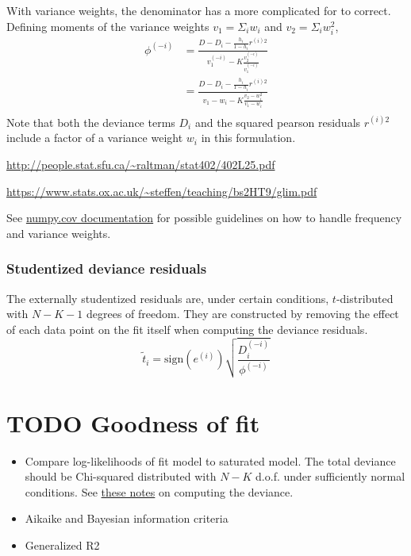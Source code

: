 \documentclass{article}
\begin{document}
With variance weights, the denominator has a more complicated for to correct.
Defining moments of the variance weights $v_1 = \Sigma_i w_i$ and $v_2 = \Sigma_i w_i^2$,
\begin{align}
  \phi^{(-i)} &= \frac{D - D_i - \frac{h_i}{1-h_i} r^{(i)2} }{v_1^{(-i)} - K \frac{v_2^{(-i)}}{v_1^{(-i)}}} \\
              &= \frac{D - D_i - \frac{h_i}{1-h_i} r^{(i)2} }{v_1 - w_i - K \frac{v_2 - w_i^2}{v_1 - w_i}} \\
\end{align}
Note that both the deviance terms $D_i$ and the squared pearson residuals
$r^{(i)2}$ include a factor of a variance weight $w_i$ in this formulation.

\url{http://people.stat.sfu.ca/~raltman/stat402/402L25.pdf}

\url{https://www.stats.ox.ac.uk/~steffen/teaching/bs2HT9/glim.pdf}

See
\href{https://numpy.org/doc/stable/reference/generated/numpy.cov.html#numpy.cov}{numpy.cov
documentation} for possible guidelines on how to handle frequency and variance
weights.

\subsubsection{Studentized deviance residuals}
The externally studentized residuals are, under certain conditions,
$t$-distributed with $N-K-1$ degrees of freedom. They are constructed by
removing the effect of each data point on the fit itself when computing the
deviance residuals.
\[\tilde{t}_i = \mathrm{sign}(e^{(i)}) \sqrt{\frac{D_i^{(-i)}}{\phi^{(-i)}}} \]

\section{TODO Goodness of fit}

\begin{itemize}
\item Compare log-likelihoods of fit model to saturated model. The total
  deviance should be Chi-squared distributed with \(N -K\) d.o.f. under
  sufficiently normal conditions.
See \href{http://people.stat.sfu.ca/~raltman/stat402/402L11.pdf}{these notes} on computing the deviance.
\item Aikaike and Bayesian information criteria
\item Generalized R2
\end{itemize}
\end{document}
